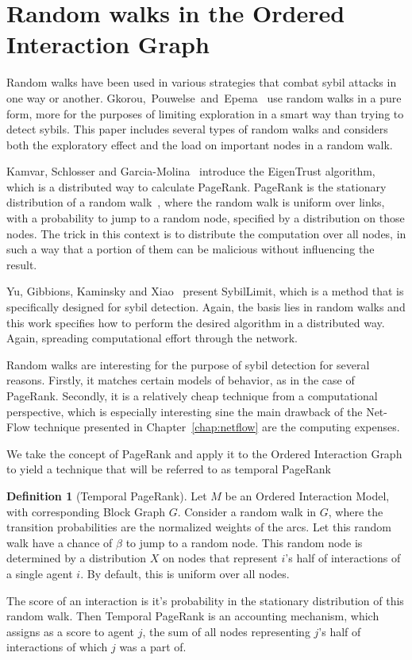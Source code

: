 \documentclass[a4paper,11pt]{book}
\theoremstyle{definition}
\newtheorem{definition}{Definition}
\begin{document}
\section{Random walks in the Ordered Interaction Graph}

Random walks have been used in various strategies that combat sybil attacks
in one way or another. Gkorou,~Pouwelse~and~Epema~\cite{gkorou2015trust} use random walks
in a pure form, more for the purposes of limiting exploration in
a smart way than trying to detect sybils. This paper includes several types
of random walks and considers both the exploratory effect and the
load on important nodes in a random walk.

Kamvar, Schlosser and Garcia-Molina~\cite{kamvar2003eigentrust} introduce
the EigenTrust algorithm, which is a distributed way to calculate PageRank.
PageRank is the stationary distribution of a random walk~\cite{page1999pagerank},
where the random walk is uniform over links, with a probability to jump to a
random node, specified by a distribution on those nodes. The trick in this context
is to distribute the computation over all nodes, in such a way that a portion
of them can be malicious without influencing the result.

Yu, Gibbions, Kaminsky and Xiao~\cite{yu2008sybillimit} present SybilLimit, which
is a method that is specifically designed for sybil detection. Again, the basis
lies in random walks and this work specifies how to perform the desired
algorithm in a distributed way. Again, spreading computational effort through
the network. 

Random walks are interesting for the purpose of sybil detection for several reasons.
Firstly, it matches certain models of behavior, as in the case of PageRank. Secondly, it 
is a relatively cheap technique from a computational perspective, which is especially
interesting sine the main
drawback of the Net-Flow technique presented in Chapter~\ref{chap:netflow} 
are the computing expenses.

We take the concept of PageRank and apply it to the Ordered Interaction Graph to
yield a technique that will be referred to as temporal PageRank

\begin{definition}[Temporal PageRank]
    Let $M$ be an Ordered Interaction Model, with corresponding Block Graph $G$.
    Consider a random walk in $G$, where the transition probabilities are the normalized
    weights of the arcs. Let this random walk have a chance of $\beta$ to jump to a random node.
    This random node is determined by a distribution $X$ on nodes that represent $i$'s half of interactions of
    a single agent $i$. By default, this is uniform over all nodes.

    The score of an interaction is it's probability in the stationary distribution of this random walk.
    Then Temporal PageRank is an accounting mechanism, which assigns as a score to agent $j$, the
    sum of all nodes representing $j$'s half of interactions of which $j$ was a part of.
\end{definition}
\end{document}
